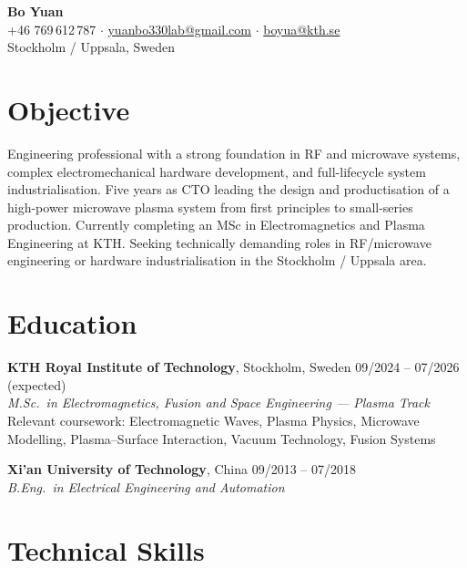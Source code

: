 \documentclass[a4paper,11pt]{article}
\begin{document}
\begin{center}
    {\LARGE \textbf{Bo Yuan}} \\
    \vspace{0.15cm}
    +46 769\,612\,787 \enspace $\cdot$ \enspace
    \href{mailto:yuanbo330lab@gmail.com}{yuanbo330lab@gmail.com} \enspace $\cdot$ \enspace
    \href{mailto:boyua@kth.se}{boyua@kth.se} \\
    Stockholm / Uppsala, Sweden
\end{center}

\vspace{0.3cm}

\section*{Objective}

Engineering professional with a strong foundation in RF and microwave systems,
complex electromechanical hardware development, and full-lifecycle system
industrialisation. Five years as CTO leading the design and productisation of a
high-power microwave plasma system from first principles to small-series production.
Currently completing an MSc in Electromagnetics and Plasma Engineering at KTH.
Seeking technically demanding roles in RF/microwave engineering or hardware
industrialisation in the Stockholm / Uppsala area.

\section*{Education}

\noindent\textbf{KTH Royal Institute of Technology}, Stockholm, Sweden
\hfill 09/2024 -- 07/2026 (expected) \\
\textit{M.Sc.\ in Electromagnetics, Fusion and Space Engineering --- Plasma Track} \\
Relevant coursework: Electromagnetic Waves, Plasma Physics, Microwave Modelling,
Plasma--Surface Interaction, Vacuum Technology, Fusion Systems

\medskip
\noindent\textbf{Xi'an University of Technology}, China \hfill 09/2013 -- 07/2018 \\
\textit{B.Eng.\ in Electrical Engineering and Automation}

\section*{Technical Skills}
\end{document}
